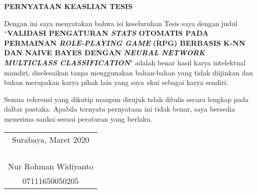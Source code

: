 \begin{center}
\large\textbf{PERNYATAAN KEASLIAN TESIS}
\end{center}
\vspace{1ex}
\begin{spacing}{1.5}

\setlength{\parindent}{0.9cm} Dengan ini saya menyatakan bahwa isi keseluruhan Tesis saya dengan judul ``\textbf{VALIDASI PENGATURAN \textit{STATS} OTOMATIS PADA PERMAINAN \textit{ROLE-PLAYING GAME} (RPG) BERBASIS K-NN DAN NAIVE BAYES DENGAN \textit{NEURAL NETWORK MULTICLASS CLASSIFICATION}}" adalah benar hasil karya intelektual mandiri, diselesaikan tanpa menggunakan bahan-bahan yang tidak diijinkan dan bukan merupakan karya pihak lain yang saya akui sebagai karya sendiri.
\vspace{1ex}

Semua referensi yang dikutip maupun dirujuk telah ditulis secara lengkap pada daftar pustaka. Apabila ternyata pernyataan ini tidak benar, saya bersedia menerima sanksi sesuai peraturan yang berlaku.
\vspace{1ex}
\end{spacing}
\begin{flushright}
\begin{tabular}[b]{c}
  Surabaya, Maret 2020\\
  \\
  \\
  \\
  \\
  Nur Rohman Widiyanto\\
  07111650050205
\end{tabular}
\end{flushright}